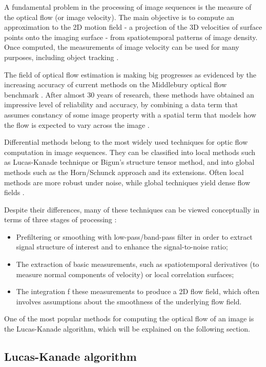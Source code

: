 \documentclass[msc, a4paper, classic, en]{ufbathesis}
\begin{document}
A fundamental problem in the processing of image sequences is the measure of the optical flow (or image velocity). The main objective is to compute an approximation to the 2D motion field - a projection of the 3D velocities of surface points onto the imaging surface - from spatiotemporal patterns of image density. Once computed, the measurements of image velocity can be used for many purposes, including object tracking \cite{opticalflow}.

The field of optical flow estimation is making big progresses as evidenced by the increasing accuracy of current methods on the Middlebury optical flow benchmark \cite{Scharstein:2002:TED:598429.598475}. After almost 30 years of research, these methods have obtained an impressive level of reliability and accuracy, by combining a data term that assumes constancy of some image property with a spatial term that models how the flow is expected to vary across the image \cite{opticalflow14}.

Differential methods belong to the most widely used techniques for optic flow computation in image sequences. They can be classified into local methods such as Lucas-Kanade technique or Bigun's structure tensor method, and into global methods such as the Horn/Schunck approach and its extensions. Often local methods are more robust under noise, while global techniques yield dense flow fields \cite{lkhs}.

Despite their differences, many of these techniques can be viewed conceptually in terms of three stages of processing \cite{opticalflow}:

\begin{itemize}
  \item Prefiltering or smoothing with low-pass/band-pass filter in order to extract signal structure of interest and to enhance the signal-to-noise ratio;
  \item The extraction of basic measurements, such as spatiotemporal derivatives (to measure normal components of velocity) or local correlation surfaces;
  \item The integration f these measurements to produce a 2D flow field, which often involves assumptions about the smoothness of the underlying flow field.
\end{itemize}

One of the most popular methods for computing the optical flow of an image is the Lucas-Kanade algorithm, which will be explained on the following section.

\subsection{Lucas-Kanade algorithm}
\end{document}
